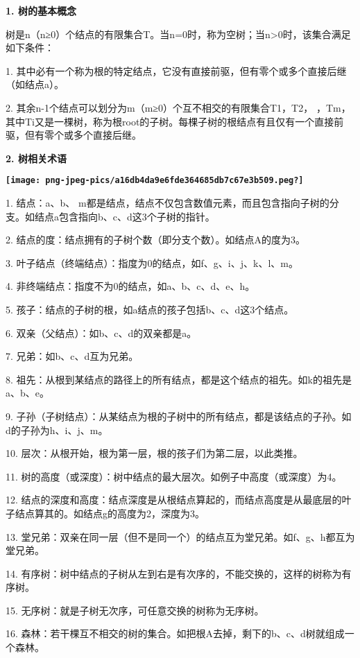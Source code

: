 {\textbf{1. 树的基本概念}}

树是n（n≥0）个结点的有限集合T。当n=0时，称为空树；当n\textgreater{}0时，该集合满足如下条件：

{1.
其中{必有一个称为根的特定结点}，它没有直接前驱，但有零个或多个直接后继（如结点a）。}

{2. 其余n-1个结点可以划分为m（m≥0）个互不相交的有限集合T1，T2，
，Tm，其中Ti又是一棵树，称为根root的子树。每棵子树的根结点有且仅有一个直接前驱，但有零个或多个直接后继。}

{\textbf{2. 树相关术语}}

{\textbf{\texttt{[image: png-jpeg-pics/a16db4da9e6fde364685db7c67e3b509.peg?]}\\
}}

{1. 结点：a、b、
m都是结点，结点不仅包含数值元素，而且包含指向子树的分支。如结点a包含指向b、c、d这3个子树的指针。}

{2. 结点的度：结点拥有的子树个数（即分支个数）。如结点A的度为3。}

{3. 叶子结点（终端结点）：指度为0的结点，如f、g、i、j、k、l、m。}

{4. 非终端结点：指度不为0的结点，如a、b、c、d、e、h。}

{5. 孩子：结点的子树的根，如a结点的孩子包括b、c、d这3个结点。}

{6. 双亲（父结点）：如b、c、d的双亲都是a。}

{7. 兄弟：如b、c、d互为兄弟。}

{8.
祖先：从根到某结点的路径上的所有结点，都是这个结点的祖先。如k的祖先是a、b、e。}

{9.
子孙（子树结点）：从某结点为根的子树中的所有结点，都是该结点的子孙。如d的子孙为h、i、j、m。}

{10. 层次：从根开始，根为第一层，根的孩子们为第二层，以此类推。}

{11.
树的高度（或深度）：树中结点的最大层次。如例子中高度（或深度）为4。}

{12.
结点的深度和高度：结点深度是从根结点算起的，而结点高度是从最底层的}{叶子结点算其的。如结点g的高度为2，深度为3。}

{13.
堂兄弟：双亲在同一层（但不是同一个）的结点互为堂兄弟。如f、g、h都互为堂兄弟。}

{14.
有序树：树中结点的子树从左到右是有次序的，不能交换的，这样的树称为有序树。}

{15. 无序树：就是子树无次序，可任意交换的树称为无序树。}

{16.
森林：若干棵互不相交的树的集合。如把根A去掉，剩下的b、c、d树就组成一个森林。}
